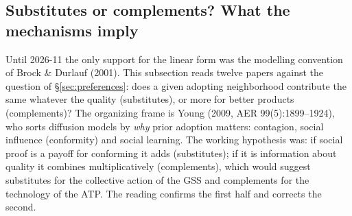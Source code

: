\documentclass[11pt,a4paper]{article}
\begin{document}
\subsection{Substitutes or complements? What the mechanisms imply}
\label{sec:mechanisms}

Until 2026-11 the only support for the linear form was the modelling convention of Brock \&
Durlauf (2001). This subsection reads twelve papers against the question of
\S\ref{sec:preferences}: does a given adopting neighborhood contribute the same whatever the
quality (substitutes), or more for better products (complements)? The organizing frame is
Young (2009, AER 99(5):1899--1924), who sorts diffusion models by \emph{why} prior adoption
matters: contagion, social influence (conformity) and social learning. The working
hypothesis was: if social proof is a payoff for conforming it adds (substitutes); if it is
information about quality it combines multiplicatively (complements), which would suggest
substitutes for the collective action of the GSS and complements for the technology of the
ATP. The reading confirms the first half and corrects the second.
\end{document}

